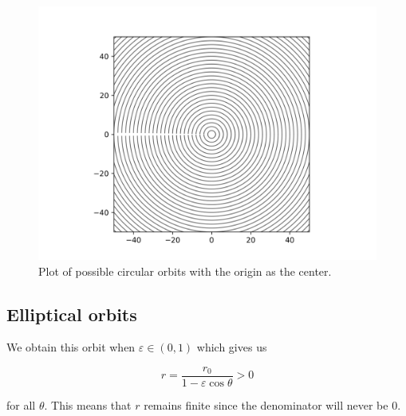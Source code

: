 \begin{frame}{\subsecname}
\begin{figure}
    \centering
    \includegraphics[height = 0.8\textheight]{assets/circle.png}
    \caption{Plot of possible circular orbits with the origin as the center.}
    \label{fig:my_label}
\end{figure}

\end{frame}

\subsection{Elliptical orbits}
\begin{frame}{\subsecname}

We obtain this orbit when \(\varepsilon \in (0,1)\) which gives us

\begin{equation}
    r = \frac{r_0}{1- \varepsilon \cos \theta} > 0
\end{equation}

for all \(\theta\). This means that \(r\) remains finite since the denominator will never be 0.

\end{frame}

